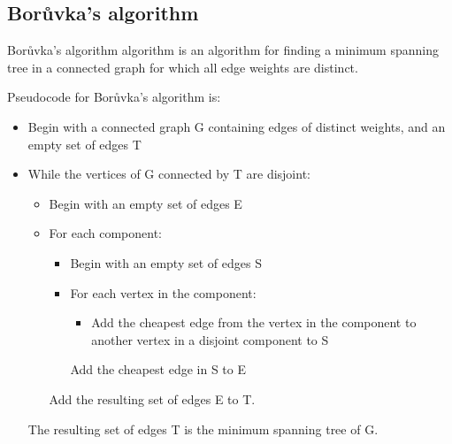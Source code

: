 \subsection{Bor\r{u}vka's algorithm}

Bor\r{u}vka's algorithm algorithm is an algorithm
for finding a minimum spanning tree in a connected graph for
which all edge weights are distinct.

Pseudocode for Bor\r{u}vka's algorithm is:

\begin{itemize}
\item
Begin with a connected graph G containing edges of distinct
 weights, and an empty set of edges T
\item
While the vertices of G connected by T are disjoint:
\begin{itemize}
\item
Begin with an empty set of edges E
\item
         For each component:
\begin{itemize}
\item
        Begin with an empty set of edges S
\item
        For each vertex in the component:
 \begin{itemize}
\item
Add the cheapest edge from the vertex in
             the component to another vertex in a disjoint component to S
\end{itemize}
        Add the cheapest edge in S to E
\end{itemize}
    Add the resulting set of edges E to T.
\end{itemize}
The resulting set of edges T is the minimum spanning tree of G.
\end{itemize}

